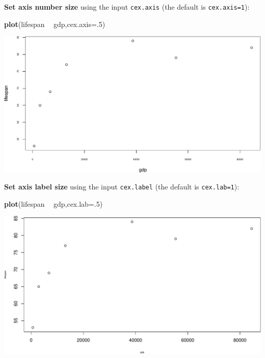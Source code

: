 \documentclass[]{book}
\newenvironment{Shaded}{\begin{snugshade}}{\end{snugshade}}
\newcommand{\DataTypeTok}[1]{\textcolor[rgb]{0.13,0.29,0.53}{#1}}
\newcommand{\DecValTok}[1]{\textcolor[rgb]{0.00,0.00,0.81}{#1}}
\newcommand{\KeywordTok}[1]{\textcolor[rgb]{0.13,0.29,0.53}{\textbf{#1}}}
\newcommand{\NormalTok}[1]{#1}
\newcommand{\OperatorTok}[1]{\textcolor[rgb]{0.81,0.36,0.00}{\textbf{#1}}}
\newcommand{\StringTok}[1]{\textcolor[rgb]{0.31,0.60,0.02}{#1}}
\begin{document}
\textbf{Set axis number size} using the input \texttt{cex.axis} (the default is \texttt{cex.axis=1}):

\begin{Shaded}
\begin{Highlighting}[]
\KeywordTok{plot}\NormalTok{(lifespan }\OperatorTok{~}\StringTok{ }\NormalTok{gdp,}\DataTypeTok{cex.axis=}\NormalTok{.}\DecValTok{5}\NormalTok{)}
\end{Highlighting}
\end{Shaded}

\includegraphics{figures/unnamed-chunk-233-1.pdf}

\textbf{Set axis label size} using the input \texttt{cex.label} (the default is \texttt{cex.lab=1}):

\begin{Shaded}
\begin{Highlighting}[]
\KeywordTok{plot}\NormalTok{(lifespan }\OperatorTok{~}\StringTok{ }\NormalTok{gdp,}\DataTypeTok{cex.lab=}\NormalTok{.}\DecValTok{5}\NormalTok{)}
\end{Highlighting}
\end{Shaded}

\includegraphics{figures/unnamed-chunk-234-1.pdf}
\end{document}
